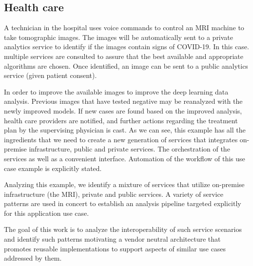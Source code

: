 \subsection{Health care}


A technician in the hospital uses voice commands to control an MRI
machine to take tomographic images. The images will be automatically
sent to a private analytics service to identify if the images contain
signs of COVID-19. In this case. multiple services are consulted to
assure that the best available and appropriate algorithms are chosen.
Once identified, an image can be sent to a public analytics service
(given patient consent).


In order to improve the available images to improve the deep learning
data analysis. Previous images that have tested negative may be
reanalyzed with the newly improved models. If new cases are found
based on the improved analysis, health care providers are notified,
and further actions regarding the treatment plan by the supervising
physician is cast. As we can see, this example has all the ingredients
that we need to create a new generation of services that integrates
on-premise infrastructure, public and private services. The
orchestration of the services as well as a convenient
interface. Automation of the workflow of this use case example is
explicitly stated.

Analyzing this example, we identify a mixture of services that utilize
on-premise infrastructure (the MRI), private and public services. A
variety of service patterns are used in concert to establish an analysis
pipeline targeted explicitly for this application use case. 

The goal of this work is to analyze the interoperability of such
service scenarios and identify such patterns motivating a vendor
neutral architecture that promotes reusable implementations to 
support aspects of similar use cases addressed by them.



